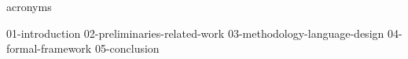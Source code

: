 \documentclass[a4paper,oneside,10pt,ngerman,english]{scrbook}
\begin{document}
\cleardoubleoddpage
{acronyms}


\mainmatter


{01-introduction}
{02-preliminaries-related-work}
{03-methodology-language-design}
{04-formal-framework}
{05-conclusion}


\cleardoubleoddpage
\printbibliography

\appendix





\cleardoubleoddpage
\end{document}
